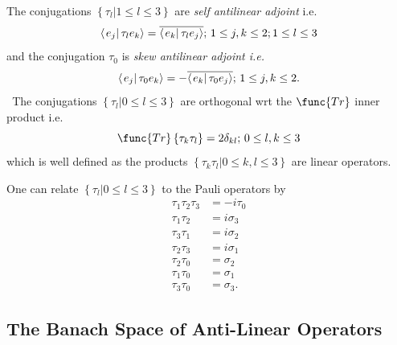 \documentclass[aps,preprint]{revtex4}
\begin{document}
The conjugations $\left\{ \left. \tau_{l}\right\vert 1\leq l\leq3\right\} $
are \emph{self antilinear adjoint} i.e. 
\begin{equation}
\left\langle \left. e_{j}\right\vert \tau_{l}e_{k}\right\rangle =\overline{%
\left\langle \left. e_{k}\right\vert \tau_{l}e_{j}\right\rangle };\,1\leq
j,k\leq2;1\leq l\leq3
\end{equation}
and the conjugation $\tau_{0}$ is \emph{skew antilinear adjoint i.e.}%
\begin{equation}
\left\langle \left. e_{j}\right\vert \tau_{0}e_{k}\right\rangle =-\overline{%
\left\langle \left. e_{k}\right\vert \tau_{0}e_{j}\right\rangle };\,1\leq
j,k\leq2.
\end{equation}
\emph{\ }The conjugations $\left\{ \left. \tau_{l}\right\vert 0\leq
l\leq3\right\} $ are orthogonal wrt the $\func{Tr}$ inner product i.e. 
\begin{equation}
\func{Tr}\left\{ \tau_{k}\tau_{l}\right\} =2\delta_{kl};\,0\leq l,k\leq3
\end{equation}
which is well defined as the products $\left\{ \left. \tau_{k}\tau
_{l}\right\vert 0\leq k,l\leq3\right\} $ are linear operators.

One can relate $\left\{ \left. \tau_{l}\right\vert 0\leq l\leq3\right\} $ to
the Pauli operators by 
\begin{align}
\tau_{1}\tau_{2}\tau_{3} & =-i\tau_{0} \\
\tau_{1}\tau_{2} & =i\sigma_{3} \\
\tau_{3}\tau_{1} & =i\sigma_{2} \\
\tau_{2}\tau_{3} & =i\sigma_{1} \\
\tau_{2}\tau_{0} & =\sigma_{2} \\
\tau_{1}\tau_{0} & =\sigma_{1} \\
\tau_{3}\tau_{0} & =\sigma_{3}.
\end{align}

\subsection{The Banach Space of Anti-Linear Operators}
\end{document}
